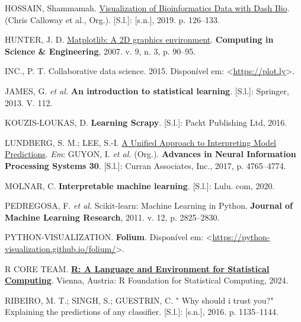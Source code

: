 \documentclass[
  12pt,
  a4paper,
]{scrreprt}
\newlength{\cslhangindent}
\newenvironment{CSLReferences}[2] %
 {\begin{list}{}{%
  \setlength{\itemindent}{0pt}
  \setlength{\leftmargin}{0pt}
  \setlength{\parsep}{0pt}
  \ifodd #1
   \setlength{\leftmargin}{\cslhangindent}
   \setlength{\itemindent}{-1\cslhangindent}
  \fi
  \setlength{\itemsep}{#2\baselineskip}}}
 {\end{list}}
\begin{document}
\begin{CSLReferences}{0}{1}
HOSSAIN, Shammamah.
\href{https://doi.org/10.25080/Majora-7ddc1dd1-012}{{V}isualization of
{B}ioinformatics {D}ata with {D}ash {B}io}. (Chris Calloway et al.,
Org.). {[}S.l.{]}: {[}s.n.{]}, 2019. p. 126--133.

HUNTER, J. D. \href{https://doi.org/10.1109/MCSE.2007.55}{Matplotlib: A
2D graphics environment}. \textbf{Computing in Science \& Engineering},
2007. v. 9, n. 3, p. 90--95.

INC., P. T. Collaborative data science. 2015. Disponível em:
\textless{}\url{https://plot.ly}\textgreater.

JAMES, G. \emph{et al.} \textbf{An introduction to statistical
learning}. {[}S.l.{]}: Springer, 2013. V. 112.

KOUZIS-LOUKAS, D. \textbf{Learning Scrapy}. {[}S.l.{]}: Packt Publishing
Ltd, 2016.

LUNDBERG, S. M.; LEE, S.-I.
\href{http://papers.nips.cc/paper/7062-a-unified-approach-to-interpreting-model-predictions.pdf}{A
Unified Approach to Interpreting Model Predictions}. \emph{Em}: GUYON,
I. \emph{et al.} (Org.). \textbf{Advances in Neural Information
Processing Systems 30}. {[}S.l.{]}: Curran Associates, Inc., 2017, p.
4765--4774.

MOLNAR, C. \textbf{Interpretable machine learning}. {[}S.l.{]}: Lulu.
com, 2020.

PEDREGOSA, F. \emph{et al.} Scikit-learn: Machine Learning in {P}ython.
\textbf{Journal of Machine Learning Research}, 2011. v. 12, p.
2825--2830.

PYTHON-VISUALIZATION. \textbf{Folium}. Disponível em:
\textless{}\url{https://python-visualization.github.io/folium/}\textgreater.

R CORE TEAM. \textbf{\href{https://www.R-project.org/}{R: A Language and
Environment for Statistical Computing}}. Vienna, Austria: R Foundation
for Statistical Computing, 2024.

RIBEIRO, M. T.; SINGH, S.; GUESTRIN, C. " Why should i trust you?"
Explaining the predictions of any classifier. {[}S.l.{]}: {[}s.n.{]},
2016. p. 1135--1144.


\end{CSLReferences}
\end{document}
